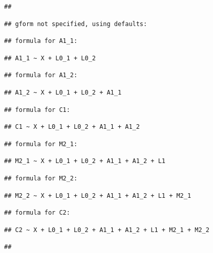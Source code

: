 \documentclass[
]{book}
\begin{document}
\begin{verbatim}
## 
\end{verbatim}

\begin{verbatim}
## gform not specified, using defaults:
\end{verbatim}

\begin{verbatim}
## formula for A1_1:
\end{verbatim}

\begin{verbatim}
## A1_1 ~ X + L0_1 + L0_2
\end{verbatim}

\begin{verbatim}
## formula for A1_2:
\end{verbatim}

\begin{verbatim}
## A1_2 ~ X + L0_1 + L0_2 + A1_1
\end{verbatim}

\begin{verbatim}
## formula for C1:
\end{verbatim}

\begin{verbatim}
## C1 ~ X + L0_1 + L0_2 + A1_1 + A1_2
\end{verbatim}

\begin{verbatim}
## formula for M2_1:
\end{verbatim}

\begin{verbatim}
## M2_1 ~ X + L0_1 + L0_2 + A1_1 + A1_2 + L1
\end{verbatim}

\begin{verbatim}
## formula for M2_2:
\end{verbatim}

\begin{verbatim}
## M2_2 ~ X + L0_1 + L0_2 + A1_1 + A1_2 + L1 + M2_1
\end{verbatim}

\begin{verbatim}
## formula for C2:
\end{verbatim}

\begin{verbatim}
## C2 ~ X + L0_1 + L0_2 + A1_1 + A1_2 + L1 + M2_1 + M2_2
\end{verbatim}

\begin{verbatim}
## 
\end{verbatim}
\end{document}
